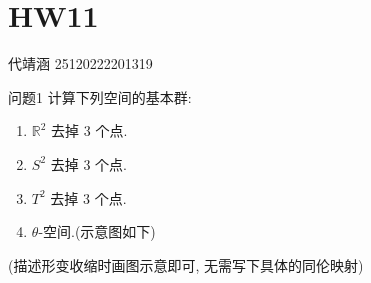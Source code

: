 \documentclass[../main.tex]{subfiles}
\begin{document}
\ifSubfilesClassLoaded{

    
 \setcounter{chapter}{10}
}{}

\chapter{ HW11 }
 代靖涵 25120222201319
\begin{exercise}{}{}
问题1 计算下列空间的基本群:
\begin{enumerate}
\item \(\mathbb{R}^2\) 去掉 \(3\) 个点.
\item \(S^2\) 去掉 \(3\) 个点.
\item \(T^2\) 去掉 \(3\) 个点.
\item \(\theta\)-空间.(示意图如下)
\end{enumerate}
\begin{center}
\end{center}
(描述形变收缩时画图示意即可, 无需写下具体的同伦映射)
\end{exercise}
\end{document}
